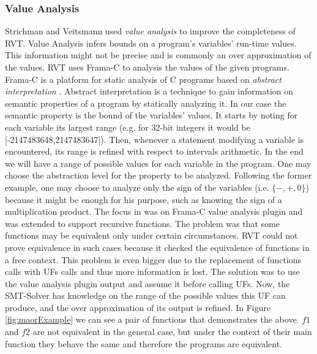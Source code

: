 
\subsubsection{Value Analysis}
Strichman and Veitsmann \cite{DBLP:conf/fm/StrichmanV16} used \emph{value analysis} to improve the completeness of RVT. Value Analysis infers bounds on a program's variables' run-time values. This information might not be precise and is commonly an over approximation of the values. RVT uses Frama-C to analysis the values of the given programs. Frama-C is a platform for static analysis of C programs based on \emph{abstract interpretation} \cite{DBLP:conf/popl/CousotC77}. Abstract interpretation is a technique to gain information on semantic properties of a program by statically analyzing it. In our case the semantic property is the bound of the variables' values. It starts by noting for each variable its largest range (e.g. for 32-bit integers it would be [-2147483648,2147483647]). Then, whenever a statement modifying a variable is encountered, its range is refined with respect to intervals arithmetic. In the end we will have a range of possible values for each variable in the program. One may choose the abstraction level for the property to be analyzed. Following the former example, one may choose to analyze only the sign of the variables (i.e. $\{-,+,0\}$) because it might be enough for his purpose, such as knowing the sign of a multiplication product. The focus in \cite{DBLP:conf/fm/StrichmanV16} was on Frama-C value analysis plugin and was extended to support recursive functions. The problem was that some functions may be equivalent only under certain circumstances. RVT could not prove equivalence in such cases because it checked the equivalence of functions in a free context. This problem is even bigger due to the replacement of functions calls with UFs calls and thus more information is lost. The solution was to use the value analysis plugin output and assume it before calling UFs. Now, the SMT-Solver has knowledge on the range of the possible values this UF can produce, and the over approximation of its output is refined. In Figure \ref{fig:maorExample} we can see a pair of functions that demonstrates the above. $f1$ and $f2$ are not equivalent in the general case, but under the context of their main function they behave the same and therefore the programs are equivalent.
 
